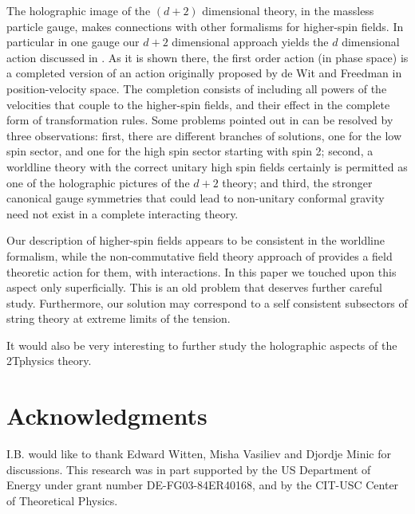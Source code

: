 \documentclass[a4paper,12pt]{article}
\begin{document}
The holographic image of the $(d+2)$ dimensional theory, in the massless
particle gauge, makes connections with other formalisms for higher-spin
fields. In particular in one gauge our $d+2$ dimensional approach yields the
$d$ dimensional action discussed in \cite{segal}. As it is shown there, the
first order action (in phase space) is a completed version of an action
originally proposed by de Wit and Freedman \cite{dwitf} in position-velocity
space. The completion consists of including all powers of the velocities
that couple to the higher-spin fields, and their effect in the complete form
of transformation rules. Some problems pointed out in \cite{segal} can be
resolved by three observations: first, there are different branches of
solutions, one for the low spin sector, and one for the high spin sector
starting with spin 2; second, a worldline theory with the correct unitary
high spin fields certainly is permitted as one of the holographic pictures
of the $d+2$ theory; and third, the stronger canonical gauge symmetries that
could lead to non-unitary conformal gravity need not exist in a complete
interacting theory.

Our description of higher-spin fields appears to be consistent in the
worldline formalism, while the non-commutative field theory approach of \cite
{ncsp} provides a field theoretic action for them, with interactions. In
this paper we touched upon this aspect only superficially. This is an old
problem \cite{vasiliev} that deserves further careful study. Furthermore,
our solution may correspond to a self consistent subsectors of string theory
at extreme limits of the tension.

It would also be very interesting to further study the holographic aspects
of the 2Tphysics theory.

\section{Acknowledgments}

I.B. would like to thank Edward Witten, Misha Vasiliev and Djordje Minic for
discussions. This research was in part supported by the US Department of
Energy under grant number DE-FG03-84ER40168, and by the CIT-USC Center of
Theoretical Physics.
\end{document}
